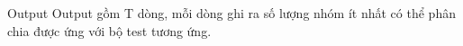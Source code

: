 Output
Output gồm T dòng, mỗi dòng ghi ra số lượng nhóm ít nhất có thể phân chia được ứng với bộ test tương ứng.